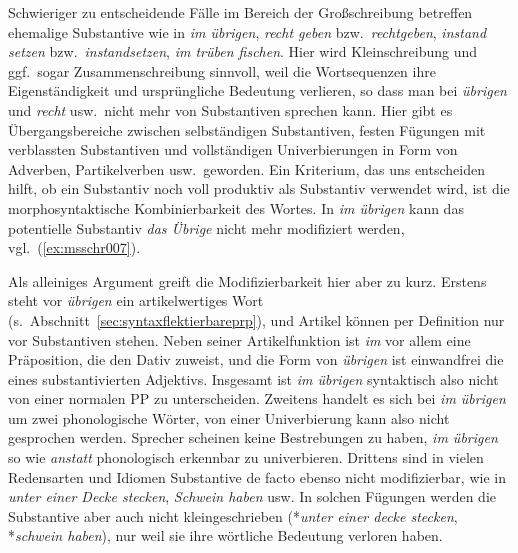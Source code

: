 Schwieriger zu entscheidende Fälle im Bereich der Großschreibung betreffen ehemalige Substantive wie in \textit{im übrigen}, \textit{recht geben} bzw.\ \textit{rechtgeben}, \textit{instand setzen} bzw.\ \textit{instandsetzen}, \textit{im trüben fischen}.
Hier wird Kleinschreibung und ggf.\ sogar Zusammenschreibung sinnvoll, weil die Wortsequenzen ihre Eigenständigkeit und ursprüngliche Bedeutung verlieren, so dass man bei \textit{übrigen} und \textit{recht} usw.\ nicht mehr von Substantiven sprechen kann.
Hier gibt es Übergangsbereiche zwischen selbständigen Substantiven, festen Fügungen mit verblassten Substantiven und vollständigen Univerbierungen in Form von Adverben, Partikelverben usw.\ geworden.
Ein Kriterium, das uns entscheiden hilft, ob ein Substantiv noch voll produktiv als Substantiv verwendet wird, ist die morphosyntaktische Kombinierbarkeit des Wortes.
In \textit{im übrigen} kann \zB das potentielle Substantiv \textit{das Übrige} \zB nicht mehr modifiziert werden, vgl.\ (\ref{ex:msschr007}).

\begin{exe}
  \ex\label{ex:msschr007} 
  \begin{xlist}
  \end{xlist}
\end{exe}

Als alleiniges Argument greift die Modifizierbarkeit hier aber zu kurz.
Erstens steht vor \textit{übrigen} ein artikelwertiges Wort (s.\ Abschnitt~\ref{sec:syntaxflektierbareprp}), und Artikel können per Definition nur vor Substantiven stehen.
Neben seiner Artikelfunktion ist \textit{im} vor allem eine Präposition, die den Dativ zuweist, und die Form von \textit{übrigen} ist einwandfrei die eines substantivierten Adjektivs.
Insgesamt ist \textit{im übrigen} syntaktisch also nicht von einer normalen PP zu unterscheiden.
Zweitens handelt es sich bei \textit{im übrigen} um zwei phonologische Wörter, von einer Univerbierung kann also nicht gesprochen werden.
Sprecher scheinen keine Bestrebungen zu haben, \textit{im übrigen} so wie \textit{anstatt} phonologisch erkennbar zu univerbieren.
Drittens sind in vielen Redensarten und Idiomen Substantive de facto ebenso nicht modifizierbar, wie \zB in \textit{unter einer Decke stecken}, \textit{Schwein haben} usw.
In solchen Fügungen werden die Substantive aber auch nicht kleingeschrieben (*\textit{unter einer decke stecken}, *\textit{schwein haben}), nur weil sie ihre wörtliche Bedeutung verloren haben.

